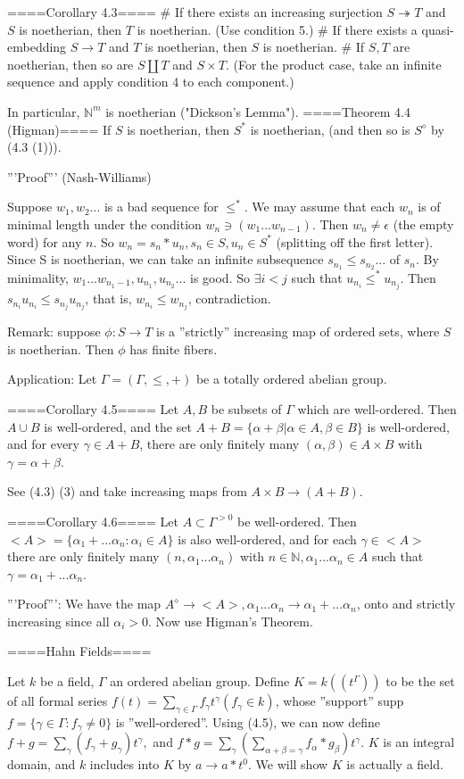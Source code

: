 ====Corollary 4.3====
# If there exists an increasing surjection $S \twoheadrightarrow T$ and $S$ is noetherian, then $T$ is noetherian. (Use condition 5.)
# If there exists a quasi-embedding $S \rightarrow T$ and $T$ is noetherian, then $S$ is noetherian.
# If $S, T$ are noetherian, then so are $S \coprod T$ and $S \times T$. (For the product case, take an infinite sequence and apply condition 4 to each component.)

In particular, $\mathbb{N}^m$ is noetherian ("Dickson's Lemma").
====Theorem 4.4 (Higman)====
If $S$ is noetherian, then $S^*$ is noetherian, (and then so is $S^\diamond$ by (4.3 (1))).

'''Proof''' (Nash-Williams)

Suppose $w_1, w_2...$ is a bad sequence for $\leq^*$. We may assume that each $w_n$ is of minimal length under the condition $w_n \ni (w_1...w_{n-1})$. Then $w_n \neq \epsilon$ (the empty word) for any $n$. So $w_n=s_{n}*u_{n}, s_n \in S, u_n  \in S^*$ (splitting off the first letter). Since S is noetherian, we can take an infinite subsequence $s_{n_1} \leq s_{n_2}...$ of $s_n$. By minimality, $w_1...w_{n_{1}-1}, u_{n_1}, u_{n_2}...$ is good. So $\exists i<j$ such that $u_{n_i} \leq^* u_{n_j}$. Then $s_{n_i}u_{n_i} \leq s_{n_j}u_{n_j}$, that is, $w_{n_i} \leq w_{n_j}$, contradiction.

Remark: suppose $\phi: S \rightarrow T$ is a ''strictly'' increasing map of ordered sets, where $S$ is noetherian. Then $\phi$ has finite fibers.

Application: Let $\Gamma=(\Gamma, \leq, +)$ be a totally ordered abelian group.

====Corollary 4.5====
Let $A, B$ be subsets of $\Gamma$ which are well-ordered. Then $A \cup B$ is well-ordered, and the set $A+B=\{\alpha + \beta | \alpha \in A, \beta \in B\}$ is well-ordered, and for every $\gamma \in A+B$, there are only finitely many $(\alpha, \beta) \in A \times B$ with $\gamma = \alpha + \beta$.

See (4.3) (3) and take increasing maps from $A \times B \rightarrow (A+B)$.

====Corollary 4.6====
Let $A \subset \Gamma^{>0}$ be well-ordered. Then $<A>=\{\alpha_1+...\alpha_n: \alpha_i \in A\}$ is also well-ordered, and for each $\gamma \in <A>$ there are only finitely many $(n, \alpha_1...\alpha_n)$ with $n \in \mathbb{N}, \alpha_1...\alpha_n \in A$ such that $\gamma=\alpha_1+...\alpha_n$.

'''Proof''':
We have the map $A^\diamond \rightarrow <A>, \alpha_1...\alpha_n \rightarrow \alpha_1+...\alpha_n$, onto and strictly increasing since all $\alpha_i >0$. Now use Higman's Theorem.

====Hahn Fields====

Let $k$ be a field, $\Gamma$ an ordered abelian group. Define $K=k((t^\Gamma))$ to be the set of all formal series $f(t)=\sum_{\gamma \in \Gamma} f_\gamma t^\gamma (f_\gamma \in k)$, whose ''support'' supp$f=\{\gamma \in \Gamma: f_\gamma \neq 0\}$ is ''well-ordered''. Using (4.5), we can now define $f+g=\sum_{\gamma} (f_\gamma + g_\gamma)t^\gamma,$ and $f*g= \sum_{\gamma} (\sum_{\alpha+\beta=\gamma} f_\alpha * g_\beta)t^\gamma$. $K$ is an integral domain, and $k$ includes into $K$ by $a \rightarrow a*t^0$. We will show $K$ is actually a field.
